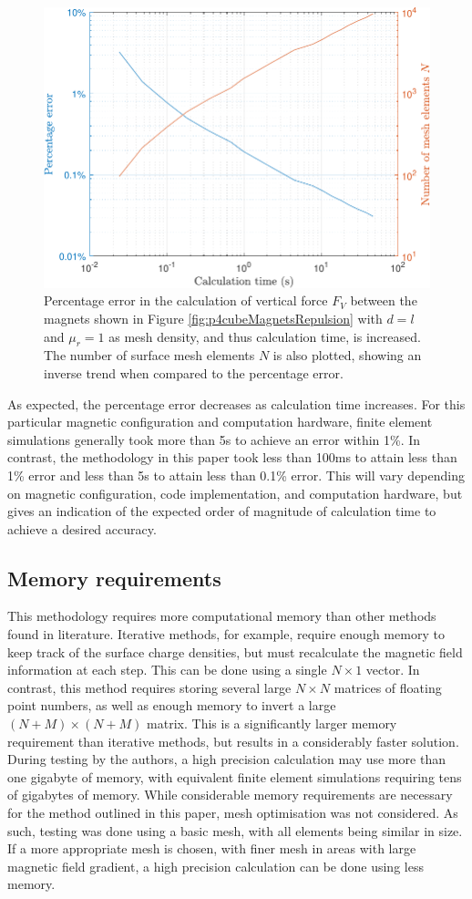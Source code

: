 \begin{figure}
	\centering
	\includegraphics[width=0.8\linewidth]{p4/p4FIG13}
	\caption{Percentage error in the calculation of vertical force \(F_V\) between the magnets shown in Figure \ref{fig:p4cubeMagnetsRepulsion} with \(d = l\) and \(\mu_r = 1\) as mesh density, and thus calculation time, is increased. The number of surface mesh elements \(N\) is also plotted, showing an inverse trend when compared to the percentage error.}
	\label{fig:p4calculationTime}
\end{figure}

As expected, the percentage error decreases as calculation time increases. For this particular magnetic configuration and computation hardware, finite element simulations generally took more than 5s to achieve an error within 1\%. In contrast, the methodology in this paper took less than 100ms to attain less than 1\% error and less than 5s to attain less than 0.1\% error. This will vary depending on magnetic configuration, code implementation, and computation hardware, but gives an indication of the expected order of magnitude of calculation time to achieve a desired accuracy.

\subsection{Memory requirements}
This methodology requires more computational memory than other methods found in literature. Iterative methods, for example, require enough memory to keep track of the surface charge densities, but must recalculate the magnetic field information at each step. This can be done using a single \(N\times 1\) vector. In contrast, this method requires storing several large \(N\times N\) matrices of floating point numbers, as well as enough memory to invert a large \(\left(N+M\right) \times \left(N+M\right)\) matrix. This is a significantly larger memory requirement than iterative methods, but results in a considerably faster solution. During testing by the authors, a high precision calculation may use more than one gigabyte of memory, with equivalent finite element simulations requiring tens of gigabytes of memory. While considerable memory requirements are necessary for the method outlined in this paper, mesh optimisation was not considered. As such, testing was done using a basic mesh, with all elements being similar in size. If a more appropriate mesh is chosen, with finer mesh in areas with large magnetic field gradient, a high precision calculation can be done using less memory.

